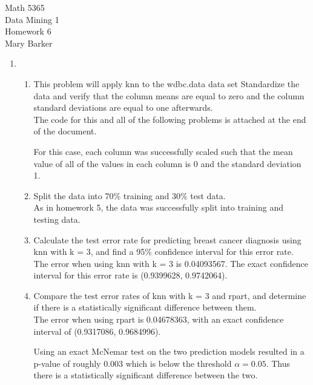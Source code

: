 \documentclass[11pt]{article}
\begin{document}
\noindent\large{Math 5365}\\
\large{Data Mining 1}\\
\large{Homework 6}\\
\large{Mary Barker}
\newline
\begin{enumerate}
\item 

\begin{enumerate}
\item This problem will apply knn to the wdbc.data data set
 Standardize the data and verify that the column means 
 are equal to zero and the column standard deviations 
 are equal to one afterwards.\\

The code for this and all of the following problems is attached at the 
end of the document. 

For this case, each column was successfully scaled such that the mean 
value of all of the values in each column is 0 and the standard deviation 1. 

\item  Split the data into 70\% training and 30\% test data.\\

As in homework 5, the data was successfully split into training and testing data. 

\item Calculate the test error rate for predicting breast 
 cancer diagnosis using knn with k = 3, and find a 95\% 
 confidence interval for this error rate.\\

The error when using knn with k = 3 is 0.04093567. 
The exact confidence interval for this error rate is (0.9399628, 0.9742064).

\item Compare the test error rates of  knn with k = 3 and 
 rpart, and determine if there is a statistically 
 significant difference between them. \\

The error when using rpart is 0.04678363, with an exact confidence interval 
of (0.9317086, 0.9684996).

Using an exact McNemar test on the two prediction models resulted in a p-value 
of roughly 0.003 which is below the threshold $\alpha = 0.05$. Thus there is 
a statistically significant difference between the two. 
\end{enumerate}


\end{enumerate}
\end{document}

